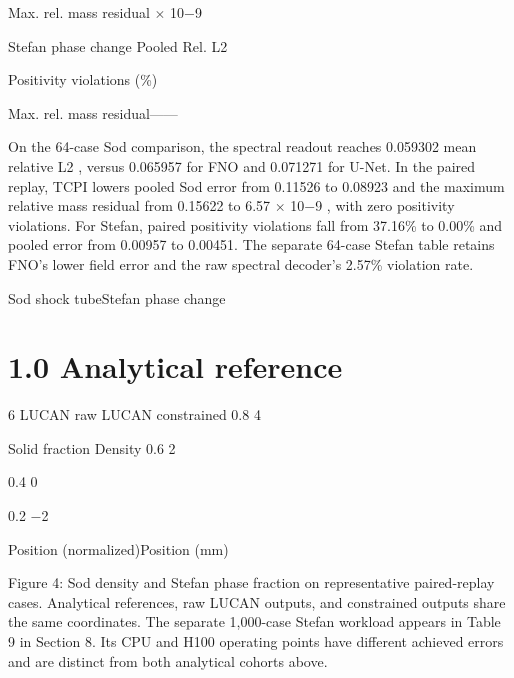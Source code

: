 \documentclass[11pt]{article}
\begin{document}
\noindent Max. rel. mass residual \ensuremath{\times} 10\ensuremath{-}9\par


\noindent Stefan phase change Pooled Rel. L2\par


\noindent Positivity violations (\%)\par


\noindent Max. rel. mass residual\quad —\quad —\par

On the 64-case Sod comparison, the spectral readout reaches 0.059302 mean relative L2 ,
versus 0.065957 for FNO and 0.071271 for U-Net. In the paired replay, TCPI lowers pooled
Sod error from 0.11526 to 0.08923 and the maximum relative mass residual from 0.15622 to
6.57 \ensuremath{\times} 10\ensuremath{-}9 , with zero positivity violations. For Stefan, paired positivity violations fall from
37.16\% to 0.00\% and pooled error from 0.00957 to 0.00451. The separate 64-case Stefan
table retains FNO’s lower field error and the raw spectral decoder’s 2.57\% violation rate.

\noindent Sod shock tube\quad Stefan phase change\par


\section*{1.0                                                                                                                 Analytical reference}

6
LUCAN raw
LUCAN constrained
0.8
4




Solid fraction
Density
0.6
2

0.4
0

0.2
\ensuremath{-}2


\par


\noindent Position (normalized)\quad Position (mm)\par




Figure 4: Sod density and Stefan phase fraction on representative paired-replay cases. Analytical
references, raw LUCAN outputs, and constrained outputs share the same coordinates.
The separate 1,000-case Stefan workload appears in Table 9 in Section 8. Its CPU and H100
operating points have different achieved errors and are distinct from both analytical cohorts
above.
\end{document}
